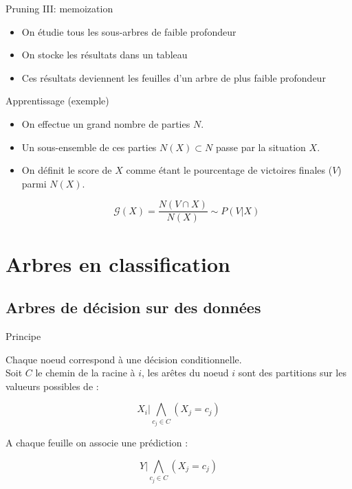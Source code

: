 \documentclass[11pt]{beamer}
\begin{document}
\begin{frame}{Pruning III: memoization}
\begin{itemize}
	\item On étudie tous les sous-arbres de faible profondeur
	\item On stocke les résultats dans un tableau
	\item Ces résultats deviennent les feuilles d'un arbre de plus faible profondeur
\end{itemize}
\end{frame}

\begin{frame}{Apprentissage (exemple)}

\begin{itemize}
	\item On effectue un grand nombre de parties $N$.
	\pause
	\item Un sous-ensemble de ces parties $N(X) \subset N$ passe par la situation $X$.
	\pause
	\item On définit le score de $X$ comme étant le pourcentage de victoires finales ($V$) parmi $N(X)$.
	
	$$\mathcal{G}(X) = \frac{N(V \cap X)}{N(X)} \sim P(V|X)$$
\end{itemize}

\end{frame}

\section{Arbres en classification}

\subsection{Arbres de décision sur des données}

\begin{frame}{Principe}

Chaque noeud correspond à une décision conditionnelle.\\

Soit $C$ le chemin de la racine à $i$, les arêtes du noeud $i$ sont des partitions sur les valueurs possibles de :

$$X_i|\bigwedge_{c_j\in C}\left( X_j=c_j \right)$$ 

A chaque feuille on associe une prédiction :

$$Y|\bigwedge_{c_j\in C} \left( X_j=c_j \right)$$

\end{frame}
\end{document}
